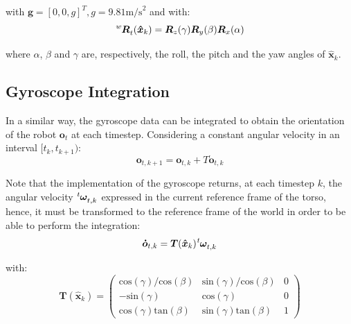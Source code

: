 \documentclass[a4paper]{article}
\begin{document}
\noindent with $\bm{g} = [0, 0, g]^T, g = 9.81 \text{m/s}^2$ and with:
\begin{equation}
    \tensor[^w]{\bm{R}}{_t}(\bm{\hat{x}}_{k}) = \bm{R}_z(\gamma) \bm{R}_y(\beta) \bm{R}_x(\alpha)
\end{equation}

\noindent where $\alpha$, $\beta$ and $\gamma$ are, respectively,
the roll, the pitch and the yaw angles of $\bm{\hat{x}}_{k}$.

\subsection{Gyroscope Integration}
\label{subsec:gyro-integration}
In a similar way, the gyroscope data can be integrated to obtain the
orientation of the robot $\bm{o}_t$ at each timestep. Considering a constant angular
velocity in an interval $[t_k, t_{k+1})$:
\begin{equation}
    \label{eq:orientation-gyro-integration}
    \bm{o}_{t,k+1} = \bm{o}_{t,k} + T \bm{\dot{o}}_{t,k}
\end{equation}


Note that the implementation of the gyroscope returns, at each
timestep $k$, the angular velocity
$\tensor[^t]{\bm{\omega}}{_{t,k}}$ expressed in the current
reference frame of the torso, hence, it must be transformed to
the reference frame of the world in order to be able to perform the
integration:
\begin{equation}
    \bm{\dot{o}}_{t,k} = \bm{T}(\bm{\hat{x}}_{k}) \tensor[^t]{\bm{\omega}}{_{t,k}}
\end{equation}

\noindent with:
\begin{equation}
    \bm{T}(\bm{\hat{x}}_{k}) =
    \begin{pmatrix}
        \text{cos}(\gamma)/\text{cos}(\beta) & \text{sin}(\gamma)/\text{cos}(\beta) & 0 \\
        -\text{sin}(\gamma) &  \text{cos}(\gamma) & 0 \\
        \text{cos}(\gamma) \text{tan}(\beta) & \text{sin}(\gamma) \text{tan}(\beta) & 1
    \end{pmatrix}
\end{equation}
\end{document}
